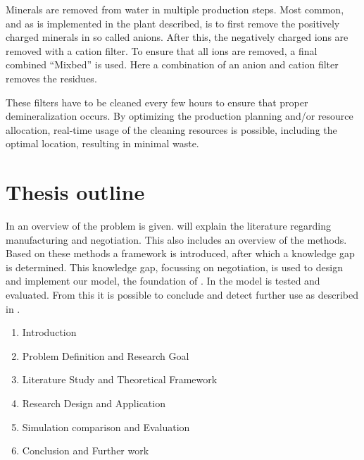 Minerals are removed from water in multiple production steps. Most common, and as is implemented in the plant described, is to first remove the positively charged minerals in so called anions. After this, the negatively charged ions are removed with a cation filter. To ensure that all ions are removed, a final combined ``Mixbed'' is used. Here a combination of an anion and cation filter removes the residues.

These filters have to be cleaned every few hours to ensure that proper demineralization occurs. By optimizing the production planning and/or resource allocation, real-time usage of the cleaning resources is possible, including the optimal location, resulting in minimal waste.

\section{Thesis outline}
In  an overview of the problem is given.  will explain the literature regarding manufacturing and negotiation. This also includes an overview of the methods. Based on these methods a framework is introduced, after which a knowledge gap is determined. This knowledge gap, focussing on negotiation, is used to design and implement our model, the foundation of . In  the model is tested and evaluated. From this it is possible to conclude and detect further use as described in .
\begin{enumerate}
	
	\item
	Introduction 
	\item
	Problem Definition and Research Goal
	\item
	Literature Study and Theoretical Framework
	\item
	Research Design and Application
	\item
	Simulation comparison and Evaluation
	\item
	Conclusion and Further work
\end{enumerate}

